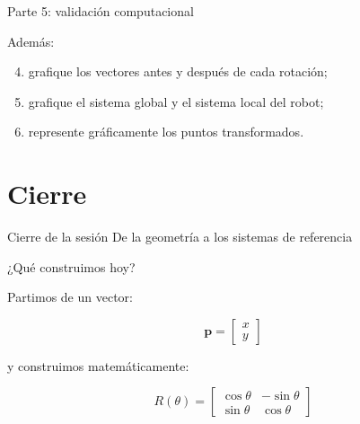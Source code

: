 \documentclass[aspectratio=169]{beamer}
\begin{document}
\begin{frame}{Parte 5: validación computacional}

    Además:

    \begin{enumerate}
        \setcounter{enumi}{3}
        \item grafique los vectores antes y después de cada rotación;
        \item grafique el sistema global y el sistema local del robot;
        \item represente gráficamente los puntos transformados.
    \end{enumerate}

    \vspace{0.3cm}


\end{frame}

\section{Cierre}

\SectionSlide
{Cierre de la sesión}
{De la geometría a los sistemas de referencia}

\begin{frame}{¿Qué construimos hoy?}

    Partimos de un vector:

    \[
    \mathbf{p}
    =
    \begin{bmatrix}
        x\\
        y
    \end{bmatrix}
    \]

    y construimos matemáticamente:

    \[
    \boxed{
        R(\theta)
        =
        \begin{bmatrix}
            \cos\theta & -\sin\theta\\
            \sin\theta & \cos\theta
    \end{bmatrix}}
    \]

\end{frame}
\end{document}
